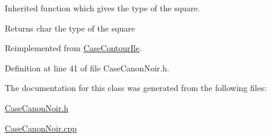 Inherited function which gives the type of the square. 

\begin{DoxyReturn}{Returns}
char the type of the square 
\end{DoxyReturn}


Reimplemented from \hyperlink{class_case_contour_ile_abf6a6d756b756611d0cc1f94260a6640}{CaseContourIle}.



Definition at line 41 of file CaseCanonNoir.h.



The documentation for this class was generated from the following files:\begin{DoxyCompactItemize}
\item 
\hyperlink{_case_canon_noir_8h}{CaseCanonNoir.h}\item 
\hyperlink{_case_canon_noir_8cpp}{CaseCanonNoir.cpp}\end{DoxyCompactItemize}
